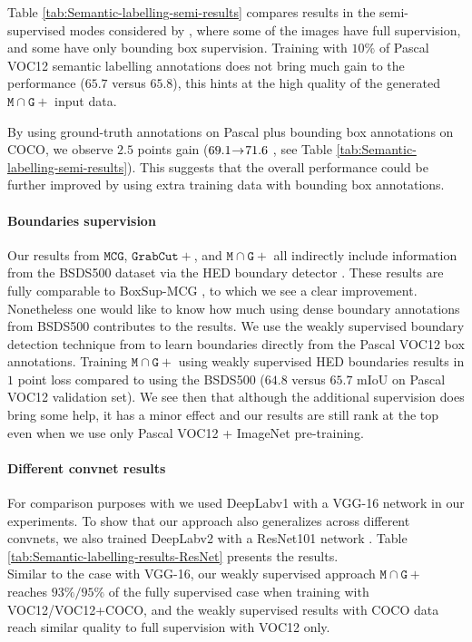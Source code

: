 \documentclass[10pt,english,british,twocolumn]{article}
\begin{document}
Table \ref{tab:Semantic-labelling-semi-results} compares results
in the semi-supervised modes considered by \cite{Dai2015Iccv,Papandreou2015Iccv},
where some of the images have full supervision, and some have only
bounding box supervision. Training with $10\%$ of Pascal VOC12 semantic
labelling annotations does not bring much gain to the performance
($65.7$ versus $65.8$), this hints at the high quality of the generated
$\mathtt{M}\cap\mathtt{G+}$ input data. 

By using ground-truth annotations on Pascal plus bounding box annotations
on COCO, we observe $2.5$ points gain ($69.1\negmedspace\rightarrow\negmedspace71.6$
, see Table \ref{tab:Semantic-labelling-semi-results}). This suggests
that the overall performance could be further improved by using extra
training data with bounding box annotations.

\paragraph{Boundaries supervision}

Our results from $\mathtt{MCG}$, $\mathtt{GrabCut+}$, and $\mathtt{M}\cap\mathtt{G+}$
all indirectly include information from the BSDS500 dataset \cite{ArbelaezMaireFowlkesMalikPAMI11}
via the HED boundary detector \cite{Xie2015Iccv}. These results are
fully comparable to BoxSup-MCG \cite{Dai2015Iccv}, to which we see
a clear improvement. Nonetheless one would like to know how much using
dense boundary annotations from BSDS500 contributes to the results.
We use the weakly supervised boundary detection technique from \cite{Khoreva2016Cvpr}
to learn boundaries directly from the Pascal VOC12 box annotations.
Training $\mathtt{M}\cap\mathtt{G+}$ using weakly supervised HED
boundaries results in $1$ point loss compared to using the BSDS500
($64.8$ versus $65.7$ mIoU on Pascal VOC12 validation set). We see
then that although the additional supervision does bring some help,
it has a minor effect and our results are still rank at the top even
when we use only Pascal VOC12 + ImageNet pre-training.

\paragraph{Different convnet results}

For comparison purposes with \cite{Dai2015Iccv,Papandreou2015Iccv}
we used Deep\-Lab\-v1 with a VGG-16 network in our experiments.
To show that our approach also generalizes across different convnets,
we also trained Deep\-Lab\-v2 with a ResNet101 network \cite{Chen2016ArxivDeeplabv2}.
Table \ref{tab:Semantic-labelling-results-ResNet} presents the results.\\
Similar to the case with VGG-16, our weakly supervised approach $\mathtt{M}\cap\mathtt{G+}$
reaches $93\%\text{/}95\%$ of the fully supervised case when training
with VOC12/VOC12+COCO, and the weakly supervised results with COCO
data reach similar quality to full supervision with VOC12 only.
\end{document}
